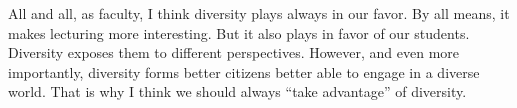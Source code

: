 \documentclass[10pt,stdletter,dateno,sigleft]{newlfm} %
\begin{document}
\begin{newlfm}
All and all, as faculty, I think diversity plays always in our favor. By all means, it makes lecturing more interesting. But it also plays in favor of our  students. Diversity exposes them to different perspectives. However, and even more importantly, diversity forms better citizens better able to engage in a diverse world. That is why I think we should always ``take advantage'' of diversity.

{\unskip}

\vspace{-10cm}

\end{newlfm}
\end{document}
